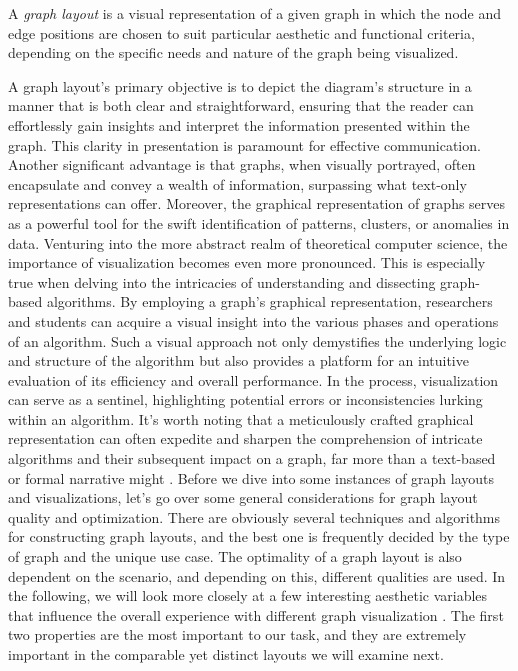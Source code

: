\documentclass[bachelor, english]{algothesis}
\begin{document}
\begin{definition}
    A \emph{graph layout} is a visual representation of a given graph in which the node and edge positions are chosen to suit particular aesthetic and functional criteria, depending on the specific needs and nature of the graph being visualized.
\end{definition}
\noindent
A graph layout's primary objective is to depict the diagram's structure in a manner that is both clear and straightforward, ensuring that the reader can effortlessly gain insights and interpret the information presented within the graph. This clarity in presentation is paramount for effective communication. Another significant advantage is that graphs, when visually portrayed, often encapsulate and convey a wealth of information, surpassing what text-only representations can offer. Moreover, the graphical representation of graphs serves as a powerful tool for the swift identification of patterns, clusters, or anomalies in data. %
Venturing into the more abstract realm of theoretical computer science, the importance of visualization becomes even more pronounced. This is especially true when delving into the intricacies of understanding and dissecting graph-based algorithms. By employing a graph's graphical representation, researchers and students can acquire a visual insight into the various phases and operations of an algorithm. Such a visual approach not only demystifies the underlying logic and structure of the algorithm but also provides a platform for an intuitive evaluation of its efficiency and overall performance. In the process, visualization can serve as a sentinel, highlighting potential errors or inconsistencies lurking within an algorithm. It's worth noting that a meticulously crafted graphical representation can often expedite and sharpen the comprehension of intricate algorithms and their subsequent impact on a graph, far more than a text-based or formal narrative might \cite{Visualization}.
Before we dive into some instances of graph layouts and visualizations, let's go over some general considerations for graph layout quality and optimization. There are obviously several techniques and algorithms for constructing graph layouts, and the best one is frequently decided by the type of graph and the unique use case. The optimality of a graph layout is also dependent on the scenario, and depending on this, different qualities are used. In the following, we will look more closely at a few interesting aesthetic variables that influence the overall experience with different graph visualization \cite{aesthetic}. The first two properties are the most important to our task, and they are extremely important in the comparable yet distinct layouts we will examine next.
\end{document}
